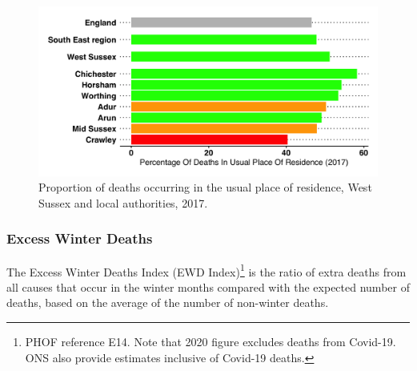 \begin{figure}
    \caption{Proportion of deaths occurring in the usual place of residence, West Sussex and local authorities, 2017.}\label{fig:DiUPR}
    \centering
    \includegraphics[width=\linewidth]{images/diupr_rag_bar.png}
\end{figure}

\subsubsection{Excess Winter Deaths}
The Excess Winter Deaths Index (EWD Index)\footnote{PHOF reference E14. Note that 2020 figure excludes deaths from Covid-19. ONS also provide estimates  inclusive of Covid-19 deaths.} is the ratio of extra deaths from all causes that occur in the winter months compared with the expected number of deaths, based on the average of the number of non-winter deaths. 

